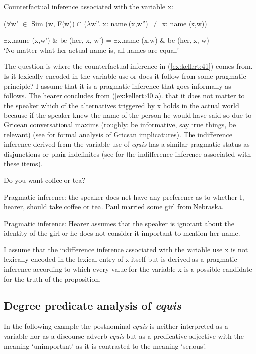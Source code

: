 \documentclass[output=paper]{langsci/langscibook}
\begin{document}
\ea\label{ex:kellert:41}
Counterfactual inference associated with the variable x:\par
($\forall$w’ $\in$ Sim (w, F(w)) $\cap$ ($\lambda$w”. x: name (x,w”) $≠$ x: name (x,w)) \par
$\exists$x.name (x,w’) \& be (her, x, w’) = $\exists$x.name (x,w) \& be (her, x, w)\\
\glt ‘No matter what her actual name is, all names are equal.’
\z

The question is where the counterfactual inference in (\ref{ex:kellert:41}) comes from. Is it lexically encoded in the variable use or does it follow from some pragmatic principle? I assume that it is a pragmatic inference that goes informally as follows. The hearer concludes from (\ref{ex:kellert:40}a). that it does not matter to the speaker which of the alternatives triggered by x holds in the actual world because if the speaker knew the name of the person he would have said so due to Gricean conversational maxims (roughly: be informative, say true things, be relevant) (see \citealt{Aloni2005} for formal analysis of Gricean implicatures). The indifference inference derived from the variable use of \textit{equis} has a similar pragmatic status as disjunctions or plain indefinites (see \citealt{Aloni2005} for the indifference inference associated with these items).

\ea\label{ex:kellert:42} Do you want coffee or tea?
\par
Pragmatic inference: the speaker does not have any preference as to whether I, hearer, should take coffee or tea.
\ex  Paul married some girl from Nebraska.
\par
Pragmatic inference: Hearer assumes that the speaker is ignorant about the 	identity of the girl or he does not consider it important to mention her name.
\z

I assume that the indifference inference associated with the variable use x is not lexically encoded in the lexical entry of x itself but is derived as a pragmatic inference according to which every value for the variable x is a possible candidate for the truth of the proposition.

\subsection{Degree predicate analysis of \textit{equis}}\label{sec:kellert:3.3}
In the following example the postnominal \textit{equis} is neither interpreted as a variable nor as a discourse adverb \textit{equis} but as a predicative adjective with the meaning ‘unimportant’ as it is contrasted to the meaning ‘serious’.
\end{document}
